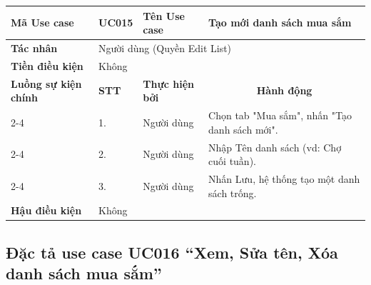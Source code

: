 \documentclass[../main.tex]{subfiles}
\begin{document}
\begin{longtable}{|p{2.7cm}|p{0.8cm}|p{2.6cm}|p{7.3cm}|}
\hline
\cellcolor[HTML]{D5F5E3}\textbf{Mã Use case} & \multicolumn{1}{l|}{UC015} & \cellcolor[HTML]{D5F5E3}\textbf{Tên Use case} & Tạo mới danh sách mua sắm \\ \hline
\cellcolor[HTML]{D5F5E3}\textbf{Tác nhân} & \multicolumn{3}{p{10.7cm}|}{Người dùng (Quyền Edit List)} \\ \hline
\cellcolor[HTML]{D5F5E3}\textbf{Tiền điều kiện} & \multicolumn{3}{p{10.7cm}|}{Không} \\ \hline

\cellcolor[HTML]{D5F5E3}\textbf{Luồng sự kiện chính} & \cellcolor[HTML]{FDEBD0}\textbf{STT} & \cellcolor[HTML]{FDEBD0}\textbf{Thực hiện bởi} & \multicolumn{1}{c|}{\cellcolor[HTML]{FDEBD0}\textbf{Hành động}} \\ \cline{2-4} 
\cellcolor[HTML]{D5F5E3} & 1. & Người dùng & Chọn tab "Mua sắm", nhấn "Tạo danh sách mới". \\ \cline{2-4} 
\cellcolor[HTML]{D5F5E3} & 2. & Người dùng & Nhập Tên danh sách (vd: Chợ cuối tuần). \\ \cline{2-4} 
\cellcolor[HTML]{D5F5E3} & 3. & Người dùng & Nhấn Lưu, hệ thống tạo một danh sách trống. \\ \hline

\cellcolor[HTML]{D5F5E3}\textbf{Hậu điều kiện} & \multicolumn{3}{p{10.7cm}|}{Không} \\ \hline
\end{longtable}
\endgroup

\subsection{Đặc tả use case UC016 ``Xem, Sửa tên, Xóa danh sách mua sắm''}
\vspace{0.5cm}

\begingroup
\renewcommand{\arraystretch}{1.5}
\end{document}
